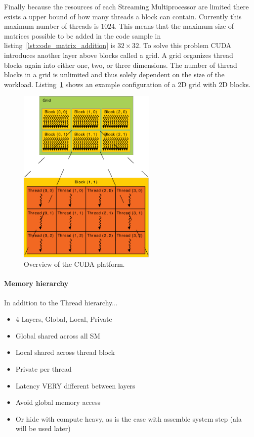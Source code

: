 \documentclass[a4paper,11pt]{kth-mag}
\begin{document}
Finally because the resources of each Streaming Multiprocessor are limited there exists a upper bound of how many threads a block can contain. Currently this maximum number of threads is $1024$. This means that the maximum size of matrices possible to be added in the code sample in listing~\ref{lst:code_matrix_addition} is $32\times32$. To solve this problem CUDA introduces another layer above blocks called a grid. A grid organizes thread blocks again into either one, two, or three dimensions. The number of thread blocks in a grid is unlimited and thus solely dependent on the size of the workload. Listing~\ref{fig:grid_blocks} shows an example configuration of a 2D grid with 2D blocks.

\begin{figure}
  \centering
  \includegraphics[width=0.6\textwidth]{img/grid_blocks.pdf}
  \caption{Overview of the CUDA platform.}
  \label{fig:grid_blocks}
\end{figure}

\paragraph{Memory hierarchy}

In addition to the Thread hierarchy...

\begin{itemize}
\item 4 Layers, Global, Local, Private
\item Global shared across all SM
\item Local shared across thread block
\item Private per thread
\item Latency VERY different between layers
\item Avoid global memory access
\item Or hide with compute heavy, as is the case with assemble system step (ala will be used later)
\end{itemize}
\end{document}
